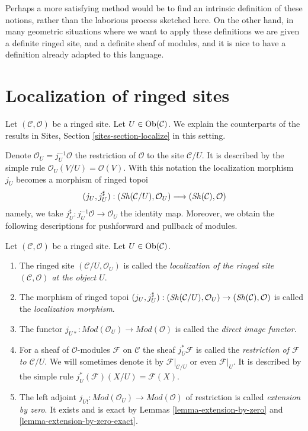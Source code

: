 \medskip\noindent
Perhaps a more satisfying method would be to find an intrinsic definition
of these notions, rather than the laborious process sketched here.
On the other hand, in many geometric situations where we want to apply
these definitions we are given a definite ringed site, and a definite
sheaf of modules, and it is nice to have a definition already adapted to
this language.




\section{Localization of ringed sites}
\label{section-localize}

\noindent
Let $(\mathcal{C}, \mathcal{O})$ be a ringed site.
Let $U \in \mathop{\mathrm{Ob}}\nolimits(\mathcal{C})$.
We explain the counterparts of the results in
Sites, Section \ref{sites-section-localize}
in this setting.

\medskip\noindent
Denote
$\mathcal{O}_U = j_U^{-1}\mathcal{O}$ the restriction of $\mathcal{O}$
to the site $\mathcal{C}/U$. It is described by the simple
rule $\mathcal{O}_U(V/U) = \mathcal{O}(V)$. With this notation
the localization morphism $j_U$ becomes a morphism of ringed topoi
$$
(j_U, j_U^\sharp) :
(\mathop{\mathit{Sh}}\nolimits(\mathcal{C}/U), \mathcal{O}_U)
\longrightarrow
(\mathop{\mathit{Sh}}\nolimits(\mathcal{C}), \mathcal{O})
$$
namely, we take $j_U^\sharp : j_U^{-1}\mathcal{O} \to \mathcal{O}_U$
the identity map.
Moreover, we obtain the following descriptions for pushforward
and pullback of modules.

\begin{definition}
\label{definition-localize-ringed-site}
Let $(\mathcal{C}, \mathcal{O})$ be a ringed site.
Let $U \in \mathop{\mathrm{Ob}}\nolimits(\mathcal{C})$.
\begin{enumerate}
\item The ringed site $(\mathcal{C}/U, \mathcal{O}_U)$ is called the
{\it localization of the ringed site $(\mathcal{C}, \mathcal{O})$
at the object $U$}.
\item The morphism of ringed topoi
$(j_U, j_U^\sharp) :
(\mathop{\mathit{Sh}}\nolimits(\mathcal{C}/U), \mathcal{O}_U)
\to
(\mathop{\mathit{Sh}}\nolimits(\mathcal{C}), \mathcal{O})$
is called the {\it localization morphism}.
\item The functor
$j_{U*} : \textit{Mod}(\mathcal{O}_U) \to \textit{Mod}(\mathcal{O})$
is called the {\it direct image functor}.
\item For a sheaf of $\mathcal{O}$-modules $\mathcal{F}$ on $\mathcal{C}$
the sheaf $j_U^*\mathcal{F}$ is called the
{\it restriction of $\mathcal{F}$ to $\mathcal{C}/U$}.
We will sometimes denote it by
$\mathcal{F}|_{\mathcal{C}/U}$ or even $\mathcal{F}|_U$.
It is described by the simple rule $j_U^*(\mathcal{F})(X/U) = \mathcal{F}(X)$.
\item The left adjoint
$j_{U!} : \textit{Mod}(\mathcal{O}_U) \to \textit{Mod}(\mathcal{O})$
of restriction is called {\it extension by zero}. It exists and is
exact by
Lemmas \ref{lemma-extension-by-zero} and
\ref{lemma-extension-by-zero-exact}.
\end{enumerate}
\end{definition}

